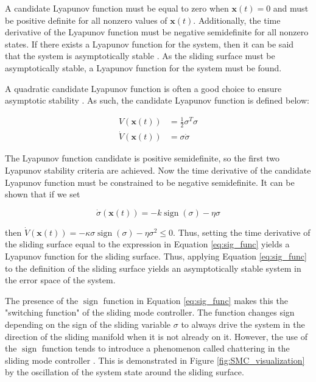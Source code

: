 \documentclass[12pt]{article}
\DeclareMathOperator{\sign}{sign}
\begin{document}
A candidate Lyapunov function must be equal to zero when $\bm x(t) = 0$ and must be positive definite for all nonzero values of $\bm x(t)$. Additionally, the time derivative of the Lyapunov function must be negative semidefinite for all nonzero states. If there exists a Lyapunov function for the system, then it can be said that the system is asymptotically stable \cite{khalil}. As the sliding surface must be asymptotically stable, a Lyapunov function for the system must be found.

A quadratic candidate Lyapunov function is often a good choice to ensure asymptotic stability \cite{SudhirSwarup}. As such, the candidate Lyapunov function is defined below:

\begin{center}
\begin{equation}
\begin{split}
V(\bm x(t)) &= \frac{1}{2}\sigma^T\sigma\\
\dot{V}(\bm x(t)) &= \sigma\dot{\sigma}
\end{split}
\end{equation}
\end{center}

The Lyapunov function candidate is positive semidefinite, so the first two Lyapunov stability criteria are achieved. Now the time derivative of the candidate Lyapunov function must be constrained to be negative semidefinite. It can be shown \cite{SMCControlObservation} \cite{SudhirSwarup} that if we set

\begin{center}
\begin{equation} \label{eq:sig_func}
\dot{\sigma}(\bm x(t)) = -k\sign(\sigma) - \eta\sigma
\end{equation}
\end{center}

then $\dot{V}(\bm x(t)) = -\kappa\sigma\sign(\sigma) - \eta\sigma^2 \leq 0$. Thus, setting the time derivative of the sliding surface equal to the expression in Equation \ref{eq:sig_func} yields a Lyapunov function for the sliding surface. Thus, applying Equation \ref{eq:sig_func} to the definition of the sliding surface yields an asymptotically stable system in the error space of the system.

The presence of the $\sign$ function in Equation \ref{eq:sig_func} makes this the "switching function" of the sliding mode controller. The function changes sign depending on the sign of the sliding variable $\sigma$ to always drive the system in the direction of the sliding manifold when it is not already on it. However, the use of the $\sign$ function tends to introduce a phenomenon called chattering in the sliding mode controller \cite{SMCControlObservation}. This is demonstrated in Figure \ref{fig:SMC_visualization} by the oscillation of the system state around the sliding surface. 
\end{document}
